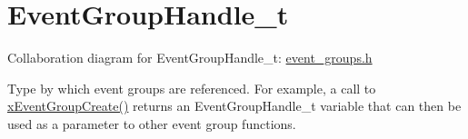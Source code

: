 \hypertarget{group___event_group_handle__t}{}\section{Event\+Group\+Handle\+\_\+t}
\label{group___event_group_handle__t}
Collaboration diagram for Event\+Group\+Handle\+\_\+t\+:
\hyperlink{event__groups_8h}{event\+\_\+groups.\+h}

Type by which event groups are referenced. For example, a call to \hyperlink{event__groups_8c_a2e8622ce280fff2f60ad867dff0a4519}{x\+Event\+Group\+Create()} returns an Event\+Group\+Handle\+\_\+t variable that can then be used as a parameter to other event group functions. 